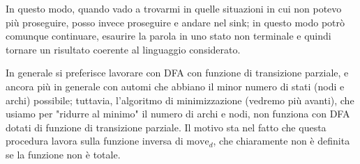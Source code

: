 \documentclass[class=book, crop=false, oneside, 12pt]{standalone}
\begin{document}
In questo modo, quando vado a trovarmi in quelle situazioni in cui non potevo più proseguire, posso invece proseguire e andare nel sink; in questo modo potrò comunque continuare, esaurire la parola in uno stato non terminale e quindi tornare un risultato coerente al linguaggio considerato.

In generale si preferisce lavorare con DFA con funzione di transizione parziale, e ancora più in generale con automi che abbiano il minor numero di stati (nodi e archi) possibile; tuttavia, l'algoritmo di minimizzazione (vedremo più avanti), che usiamo per "ridurre al minimo" il numero di archi e nodi, non funziona con DFA dotati di funzione di transizione parziale. Il motivo sta nel fatto che questa procedura lavora sulla funzione inversa di \(\textrm{move}_d\), che chiaramente non è definita se la funzione non è totale.
\end{document}
